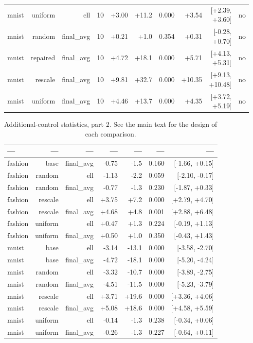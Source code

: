 \documentclass[10pt]{article}
\begin{document}
\begin{table}[h]
\begin{tabular}{lrrrrrrrrr}
mnist & uniform & ell & 10 & +3.00 & +11.2 & 0.000 & +3.54 & [+2.39, +3.60] & no \\
mnist & random & final\_avg & 10 & +0.21 & +1.0 & 0.354 & +0.31 & [-0.28, +0.70] & no \\
mnist & repaired & final\_avg & 10 & +4.72 & +18.1 & 0.000 & +5.71 & [+4.13, +5.31] & no \\
mnist & rescale & final\_avg & 10 & +9.81 & +32.7 & 0.000 & +10.35 & [+9.13, +10.48] & no \\
mnist & uniform & final\_avg & 10 & +4.46 & +13.7 & 0.000 & +4.35 & [+3.72, +5.19] & no \\
\bottomrule
\end{tabular}
\end{table}

\begin{table}[h]
\centering\scriptsize
\caption{Additional-control statistics, part 2. See the main text for the design of each comparison.}
\label{tab:sup-s5-2}
\begin{tabular}{lrrrrrr}
\toprule
--- & --- & --- & --- & --- & --- & --- \\
\midrule
fashion & base & final\_avg & -0.75 & -1.5 & 0.160 & [-1.66, +0.15] \\
fashion & random & ell & -1.13 & -2.2 & 0.059 & [-2.10, -0.17] \\
fashion & random & final\_avg & -0.77 & -1.3 & 0.230 & [-1.87, +0.33] \\
fashion & rescale & ell & +3.75 & +7.2 & 0.000 & [+2.79, +4.70] \\
fashion & rescale & final\_avg & +4.68 & +4.8 & 0.001 & [+2.88, +6.48] \\
fashion & uniform & ell & +0.47 & +1.3 & 0.224 & [-0.19, +1.13] \\
fashion & uniform & final\_avg & +0.50 & +1.0 & 0.350 & [-0.43, +1.43] \\
mnist & base & ell & -3.14 & -13.1 & 0.000 & [-3.58, -2.70] \\
mnist & base & final\_avg & -4.72 & -18.1 & 0.000 & [-5.20, -4.24] \\
mnist & random & ell & -3.32 & -10.7 & 0.000 & [-3.89, -2.75] \\
mnist & random & final\_avg & -4.51 & -11.5 & 0.000 & [-5.23, -3.79] \\
mnist & rescale & ell & +3.71 & +19.6 & 0.000 & [+3.36, +4.06] \\
mnist & rescale & final\_avg & +5.08 & +18.6 & 0.000 & [+4.58, +5.59] \\
mnist & uniform & ell & -0.14 & -1.3 & 0.238 & [-0.34, +0.06] \\
mnist & uniform & final\_avg & -0.26 & -1.3 & 0.227 & [-0.64, +0.11] \\
\bottomrule
\end{tabular}
\end{table}
\end{document}
